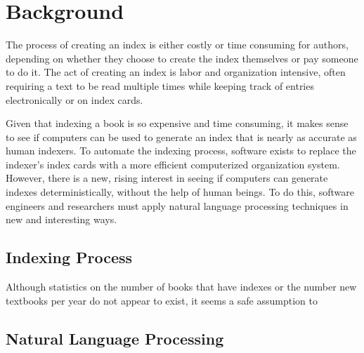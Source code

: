 \section{Background}
The process of creating an index is either costly or time consuming for authors, depending on whether they choose to create the index themselves or pay someone to do it.
The act of creating an index is labor and organization intensive, often requiring a text to be read multiple times while keeping track of entries electronically or on index cards.

Given that indexing a book is so expensive and time consuming, it makes sense to see if computers can be used to generate an index that is nearly as accurate as human indexers.
To automate the indexing process, software exists to replace the indexer's index cards with a more efficient computerized organization system.
However, there is a new, rising interest in seeing if computers can generate indexes deterministically, without the help of human beings.
To do this, software engineers and researchers must apply natural language processing techniques in new and interesting ways.

\subsection{Indexing Process}


Although statistics on the number of books that have indexes or the number new textbooks per year do not appear to exist, it seems a safe assumption to 

\subsection{Natural Language Processing}